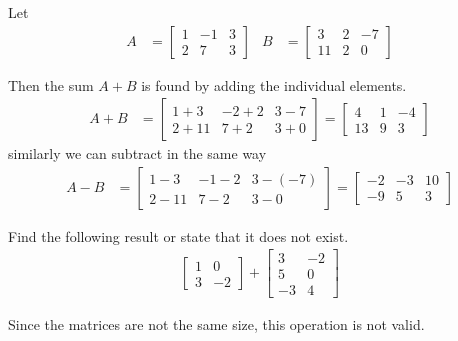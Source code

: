 \bigskip 
\begin{example}
Let
%
\begin{align*}
A & = \begin{bmatrix}
1 & -1 & 3 \\
2 & 7 & 3
\end{bmatrix} & 
B & = \begin{bmatrix}
3 & 2 & -7 \\ 11 & 2 & 0
\end{bmatrix}
\end{align*}

Then the sum $A+B$ is found by adding the individual elements. 
%
\begin{align*}
A+B & = \begin{bmatrix}
1+3 & -2+2 & 3-7\\ 2+11 & 7+2 & 3+0
\end{bmatrix}= \begin{bmatrix}
4 & 1 & -4 \\ 13 & 9 & 3
\end{bmatrix}
\end{align*}
similarly we can subtract in the same way
\begin{align*}
A-B & = 
\begin{bmatrix}
1-3 & -1-2 & 3-(-7)\\ 
2-11 & 7-2 & 3-0 
\end{bmatrix}= 
\begin{bmatrix}
-2 & -3 & 10 \\ 
-9 & 5 & 3 
\end{bmatrix}
\end{align*}

\end{example}


\begin{example}
 Find the following result or state that it does not exist. 
\begin{align*}
\begin{bmatrix}
 1 & 0 \\ 3 & -2 
\end{bmatrix} + 
\begin{bmatrix}
 3 & -2 \\
 5 & 0 \\
 -3 & 4
\end{bmatrix}
\end{align*}

\solution

Since the matrices are not the same size, this operation is not valid.  

\end{example}

